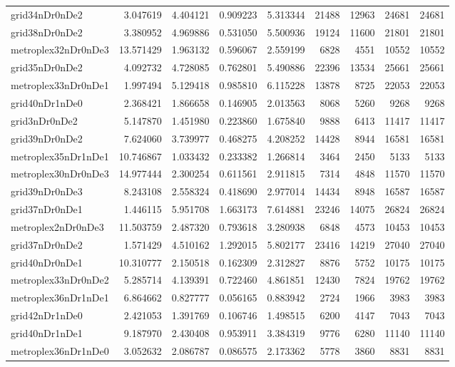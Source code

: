 \begin{longtable}{|l|r|r|r|r|r|r|r|r|}
grid34nDr0nDe2 & 3.047619 & 4.404121 & 0.909223 & 5.313344 & 21488 & 12963 & 24681 & 24681 \\
grid38nDr0nDe2 & 3.380952 & 4.969886 & 0.531050 & 5.500936 & 19124 & 11600 & 21801 & 21801 \\
metroplex32nDr0nDe3 & 13.571429 & 1.963132 & 0.596067 & 2.559199 & 6828 & 4551 & 10552 & 10552 \\
grid35nDr0nDe2 & 4.092732 & 4.728085 & 0.762801 & 5.490886 & 22396 & 13534 & 25661 & 25661 \\
metroplex33nDr0nDe1 & 1.997494 & 5.129418 & 0.985810 & 6.115228 & 13878 & 8725 & 22053 & 22053 \\
grid40nDr1nDe0 & 2.368421 & 1.866658 & 0.146905 & 2.013563 & 8068 & 5260 & 9268 & 9268 \\
grid3nDr0nDe2 & 5.147870 & 1.451980 & 0.223860 & 1.675840 & 9888 & 6413 & 11417 & 11417 \\
grid39nDr0nDe2 & 7.624060 & 3.739977 & 0.468275 & 4.208252 & 14428 & 8944 & 16581 & 16581 \\
metroplex35nDr1nDe1 & 10.746867 & 1.033432 & 0.233382 & 1.266814 & 3464 & 2450 & 5133 & 5133 \\
metroplex30nDr0nDe3 & 14.977444 & 2.300254 & 0.611561 & 2.911815 & 7314 & 4848 & 11570 & 11570 \\
grid39nDr0nDe3 & 8.243108 & 2.558324 & 0.418690 & 2.977014 & 14434 & 8948 & 16587 & 16587 \\
grid37nDr0nDe1 & 1.446115 & 5.951708 & 1.663173 & 7.614881 & 23246 & 14075 & 26824 & 26824 \\
metroplex2nDr0nDe3 & 11.503759 & 2.487320 & 0.793618 & 3.280938 & 6848 & 4573 & 10453 & 10453 \\
grid37nDr0nDe2 & 1.571429 & 4.510162 & 1.292015 & 5.802177 & 23416 & 14219 & 27040 & 27040 \\
grid40nDr0nDe1 & 10.310777 & 2.150518 & 0.162309 & 2.312827 & 8876 & 5752 & 10175 & 10175 \\
metroplex33nDr0nDe2 & 5.285714 & 4.139391 & 0.722460 & 4.861851 & 12430 & 7824 & 19762 & 19762 \\
metroplex36nDr1nDe1 & 6.864662 & 0.827777 & 0.056165 & 0.883942 & 2724 & 1966 & 3983 & 3983 \\
grid42nDr1nDe0 & 2.421053 & 1.391769 & 0.106746 & 1.498515 & 6200 & 4147 & 7043 & 7043 \\
grid40nDr1nDe1 & 9.187970 & 2.430408 & 0.953911 & 3.384319 & 9776 & 6280 & 11140 & 11140 \\
metroplex36nDr1nDe0 & 3.052632 & 2.086787 & 0.086575 & 2.173362 & 5778 & 3860 & 8831 & 8831 \\

\end{longtable}
